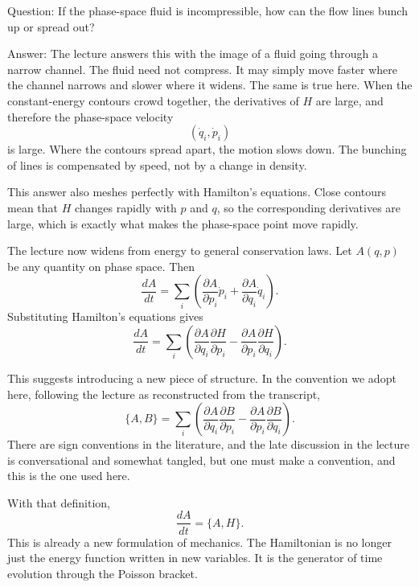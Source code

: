 Question: If the phase-space fluid is incompressible, how can the flow lines bunch up or spread out?

Answer: The lecture answers this with the image of a fluid going through a narrow channel. The fluid need not compress. It may simply move faster where the channel narrows and slower where it widens. The same is true here. When the constant-energy contours crowd together, the derivatives of \(H\) are large, and therefore the phase-space velocity
\begin{equation}
(\dot q_i,\dot p_i)
\end{equation}
is large. Where the contours spread apart, the motion slows down. The bunching of lines is compensated by speed, not by a change in density.

This answer also meshes perfectly with Hamilton's equations. Close contours mean that \(H\) changes rapidly with \(p\) and \(q\), so the corresponding derivatives are large, which is exactly what makes the phase-space point move rapidly.

The lecture now widens from energy to general conservation laws. Let \(A(q,p)\) be any quantity on phase space. Then
\begin{equation}
\frac{dA}{dt}
=
\sum_i
\left(
\frac{\partial A}{\partial p_i}\dot p_i
+
\frac{\partial A}{\partial q_i}\dot q_i
\right).
\end{equation}
Substituting Hamilton's equations gives
\begin{equation}
\frac{dA}{dt}
=
\sum_i
\left(
\frac{\partial A}{\partial q_i}\frac{\partial H}{\partial p_i}
-
\frac{\partial A}{\partial p_i}\frac{\partial H}{\partial q_i}
\right).
\end{equation}

This suggests introducing a new piece of structure. In the convention we adopt here, following the lecture as reconstructed from the transcript,
\begin{equation}
\{A,B\}
=
\sum_i
\left(
\frac{\partial A}{\partial q_i}\frac{\partial B}{\partial p_i}
-
\frac{\partial A}{\partial p_i}\frac{\partial B}{\partial q_i}
\right).
\end{equation}
There are sign conventions in the literature, and the late discussion in the lecture is conversational and somewhat tangled, but one must make a convention, and this is the one used here.

With that definition,
\begin{equation}
\frac{dA}{dt}=\{A,H\}.
\end{equation}
This is already a new formulation of mechanics. The Hamiltonian is no longer just the energy function written in new variables. It is the generator of time evolution through the Poisson bracket.


